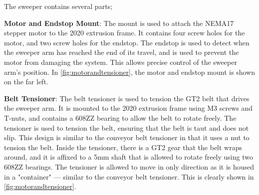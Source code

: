 The sweeper contains several parts;

\textbf{Motor and Endstop Mount}: The mount is used to attach the NEMA17 stepper motor to the 2020 extrusion frame. It contains four screw holes for the motor, and two screw holes for the endstop. The endstop is used to detect when the sweeper arm has reached the end of its travel, and is used to prevent the motor from damaging the system. This allows precise control of the sweeper arm's position. In \autoref{fig:motorandtensioner}, the motor and endstop mount is shown on the far left.
\par
\textbf{Belt Tensioner}: The belt tensioner is used to tension the GT2 belt that drives the sweeper arm. It is mounted to the 2020 extrusion frame using M3 screws and T-nuts, and contains a 608ZZ bearing to allow the belt to rotate freely. The tensioner is used to tension the belt, ensuring that the belt is taut and does not slip. This design is similar to the conveyor belt tensioner in that it uses a nut to tension the belt. Inside the tensioner, there is a GT2 gear that the belt wraps around, and it is affixed to a 5mm shaft that is allowed to rotate freely using two 608ZZ bearings. The tensioner is allowed to move in only direction as it is housed in a "container" --- similar to the conveyor belt tensioner. This is clearly shown in \autoref{fig:motorandtensioner}.

